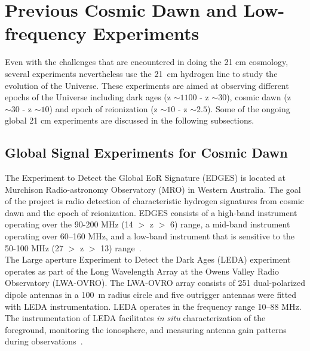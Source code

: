 	    \section{Previous Cosmic Dawn and Low-frequency Experiments}
	    
	    Even with the challenges that are encountered in doing the 21 cm cosmology, several experiments nevertheless use the \SI{21}{cm} hydrogen line to study the evolution of the Universe. These experiments are aimed at observing different epochs of the Universe including dark ages (z $\sim1100$ - z $\sim30$), cosmic dawn (z $\sim30$ - z $\sim10$) and epoch of reionization (z $\sim10$ - z $\sim2.5$). Some of the ongoing global 21 cm experiments are discussed in the following subsections.\\
	    
	    
	    \subsection{Global Signal Experiments for Cosmic Dawn}
	    
	    The Experiment to Detect the Global EoR Signature (EDGES) is located at Murchison Radio-astronomy Observatory (MRO) in Western Australia. The goal of the project is radio detection of characteristic hydrogen signatures from cosmic dawn and the epoch of reionization. EDGES consists of a high-band instrument operating over the 90-200 MHz (14 $>$ z $>$ 6) range, a mid-band instrument operating over 60–160 MHz, and a low-band instrument that is sensitive to the 50-100 MHz (27 $>$ z $>$ 13) range~\cite{2017ApJ...835...49M}.\\
	    
	    The Large aperture Experiment to Detect the Dark Ages (LEDA) experiment operates as part of the Long Wavelength Array at the Owens Valley Radio Observatory (LWA-OVRO). The LWA-OVRO array consists of 251 dual-polarized dipole antennas in a \SI{100}{\meter} radius circle and five outrigger antennas were fitted with LEDA instrumentation. LEDA operates in the frequency range 10–88 MHz. The instrumentation of LEDA facilitates \textit{in situ} characterization of the foreground, monitoring the ionosphere, and measuring antenna gain patterns during observations~\citep{2012JAI.....150004T, 2018MNRAS.478.4193P}.\\
	    
